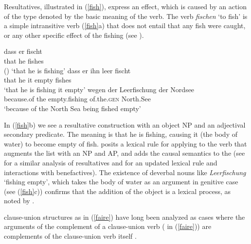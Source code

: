 \documentclass[output=paper
 	        ,biblatex
                ,babelshorthands
                ,newtxmath
                ,draftmode
                ,colorlinks, citecolor=brown
]{langscibook}
\begin{document}
Resultatives, illustrated in (\ref{fish}), express an effect, which is caused by an
action of the type denoted by the basic meaning of the verb. The verb \textit{fischen} `to fish' is
a simple intransitive verb (\ref{fish}a) that does not entail that any fish were caught, or any
other specific effect of the fishing (see \citealt[219--220]{Mueller2002b}).  

\begin{exe}
\ex\label{fish}
\begin{xlist}
\ex
\gll dass er  fischt\\
     that he  fishes\\\hfill()
\glt `that he is fishing'
\ex 
\gll dass er ihn leer fischt\\
     that he it empty fishes\\
\glt `that he is fishing it empty'
\ex 
\gll wegen der Leerfischung der Nordsee\footnotemark\\
     because.of the empty.fishing of.the.\textsc{gen} North.See \\
\glt `because of the North Sea being fished empty'
\end{xlist}
\end{exe}

\noindent
 In (\ref{fish}b) we see a resultative construction with an object NP and an adjectival secondary predicate.
 The meaning is that he is fishing, causing it (the body of water) to become empty of fish.  \citet[241]{Mueller2002b} posits a lexical rule for  applying to the verb that augments the \argst list with an NP and AP, and adds the causal semantics to the \content (see \citealt{Wechsler2005result} for a similar analysis of  resultatives and \citealt[Section~7.2.3]{MuellerLFGphrasal} for an updated lexical rule and interactions with benefactives).     The existence of deverbal nouns like \textit{Leerfischung} `fishing empty', which takes the body of water as an argument in genitive case (see (\ref{fish}c)) confirms that the addition of the object is a lexical process, as noted by \citet{Mueller2002b}.  

 clause-union structures as in (\ref{faire}) have long been analyzed as cases where the arguments of the complement of a clause-union verb ( in (\ref{faire})) are complements of the clause-union verb itself \citep{Aissen1979}.
\end{document}
